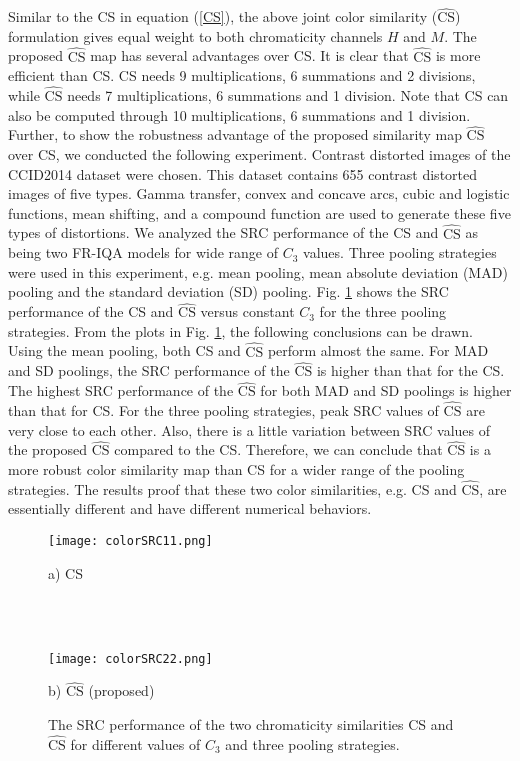 Similar to the CS in equation (\ref{CS}), the above joint color similarity ($\widehat{\text{CS}}$) formulation gives equal weight to both chromaticity channels $H$ and $M$. The proposed $\widehat{\text{CS}}$ map has several advantages over CS. It is clear that $\widehat{\text{CS}}$ is more efficient than CS. CS needs 9 multiplications, 6 summations and 2 divisions, while $\widehat{\text{CS}}$ needs 7 multiplications, 6 summations and 1 division. Note that CS can also be computed through 10 multiplications, 6 summations and 1 division. Further, to show the robustness advantage of the proposed similarity map $\widehat{\text{CS}}$ over CS, we conducted the following experiment. Contrast distorted images of the CCID2014 dataset \cite{CCID2014} were chosen. This dataset contains 655 contrast distorted images of five types. Gamma transfer, convex and concave arcs, cubic and logistic functions, mean shifting, and a compound function are used to generate these five types of distortions. We analyzed the SRC performance of the CS and $\widehat{\text{CS}}$ as being two FR-IQA models for wide range of $C_3$ values. Three pooling strategies were used in this experiment, e.g. mean pooling, mean absolute deviation (MAD) pooling and the standard deviation (SD) pooling. Fig. \ref{CSJCS} shows the SRC performance of the CS and $\widehat{\text{CS}}$ versus constant $C_3$ for the three pooling strategies. From the plots in Fig. \ref{CSJCS}, the following conclusions can be drawn. Using the mean pooling, both CS and $\widehat{\text{CS}}$ perform almost the same. For MAD and SD poolings, the SRC performance of the $\widehat{\text{CS}}$ is higher than that for the CS. The highest SRC performance of the $\widehat{\text{CS}}$ for both MAD and SD poolings is higher than that for CS. For the three pooling strategies, peak SRC values of $\widehat{\text{CS}}$ are very close to each other. Also, there is a little variation between SRC values of the proposed $\widehat{\text{CS}}$ compared to the CS. Therefore, we can conclude that $\widehat{\text{CS}}$ is a more robust color similarity map than CS for a wider range of the pooling strategies. The results proof that these two color similarities, e.g. CS and $\widehat{\text{CS}}$, are essentially different and have different numerical behaviors. 


\begin{figure}[htb]
\scriptsize
\begin{minipage}[b]{0.99\linewidth}
  \centering
  \centerline{\texttt{[image: colorSRC11.png]}} 
  \vspace{0.10cm}
\centerline{a) CS}
\end{minipage}
\\ \\
\begin{minipage}[b]{.99\linewidth}
  \centering
  \centerline{\texttt{[image: colorSRC22.png]}}
  \vspace{0.10cm}
\centerline{b) $\widehat{\text{CS}}$ (proposed)}
\end{minipage}
\caption{The SRC performance of the two chromaticity similarities CS and $\widehat{\text{CS}}$ for different values of $C_3$ and three pooling strategies.}
\label{CSJCS}
\end{figure}


